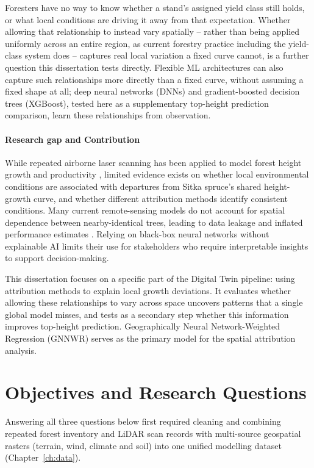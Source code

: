 \documentclass[logo,msc,ai]{infthesis}           %
\begin{document}
Foresters have no way to know whether a stand's assigned yield class still holds, or what local conditions are driving it away from that expectation. Whether allowing that relationship to instead vary spatially -- rather than being applied uniformly across an entire region, as current forestry practice including the yield-class system does -- captures real local variation a fixed curve cannot, is a further question this dissertation tests directly. Flexible ML architectures can also capture such relationships more directly than a fixed curve, without assuming a fixed shape at all; deep neural networks (DNNs) and gradient-boosted decision trees (XGBoost), tested here as a supplementary top-height prediction comparison, learn these relationships from observation.

\paragraph*{Research gap and Contribution}
While repeated airborne laser scanning has been applied to model forest height growth and productivity \cite{janiec2023Development_C1_SS}, limited evidence exists on whether local environmental conditions are associated with departures from Sitka spruce's shared height-growth curve, and whether different attribution methods identify consistent conditions. Many current remote-sensing models do not account for spatial dependence between nearby-identical trees, leading to data leakage and inflated performance estimates \cite{Karasiak2022Spatial_C5_EVAL, ploton2020Spatial_C5_EVAL, lynch2025Digital_C4_NN}. Relying on black-box neural networks without explainable AI limits their use for stakeholders who require interpretable insights to support decision-making.

This dissertation focuses on a specific part of the Digital Twin pipeline: using attribution methods to explain local growth deviations. It evaluates whether allowing these relationships to vary across space uncovers patterns that a single global model misses, and tests as a secondary step whether this information improves top-height prediction. Geographically Neural Network-Weighted Regression (GNNWR) serves as the primary model for the spatial attribution analysis. 

\section{Objectives and Research Questions}

Answering all three questions below first required cleaning and combining repeated forest
inventory and LiDAR scan records with multi-source geospatial rasters (terrain, wind, climate
and soil) into one unified modelling dataset (Chapter~\ref{ch:data}).
\end{document}
